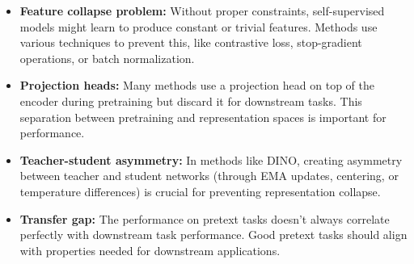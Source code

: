 \begin{itemize}
    \item \textbf{Feature collapse problem:} Without proper constraints, self-supervised models might learn to produce constant or trivial features. Methods use various techniques to prevent this, like contrastive loss, stop-gradient operations, or batch normalization.
    
    \item \textbf{Projection heads:} Many methods use a projection head on top of the encoder during pretraining but discard it for downstream tasks. This separation between pretraining and representation spaces is important for performance.
    
    \item \textbf{Teacher-student asymmetry:} In methods like DINO, creating asymmetry between teacher and student networks (through EMA updates, centering, or temperature differences) is crucial for preventing representation collapse.
    
    \item \textbf{Transfer gap:} The performance on pretext tasks doesn't always correlate perfectly with downstream task performance. Good pretext tasks should align with properties needed for downstream applications.
\end{itemize}
